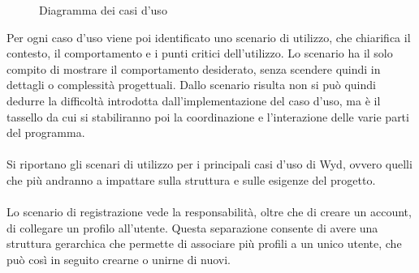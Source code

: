 \begin{figure}[htb]
    \centering
    \caption{Diagramma dei casi d'uso}
\end{figure}

Per ogni caso d'uso viene poi identificato uno scenario di utilizzo,
che chiarifica il contesto, il comportamento e i punti critici dell'utilizzo.
Lo scenario ha il solo compito di mostrare il comportamento desiderato,
senza scendere quindi in dettagli o complessità progettuali.
Dallo scenario risulta non si può quindi dedurre la difficoltà 
introdotta dall'implementazione del caso d'uso,
ma è il tassello da cui si stabiliranno poi la coordinazione e l'interazione delle varie parti del programma.\\
\\
Si riportano gli scenari di utilizzo per i principali casi d'uso di Wyd,
ovvero quelli che più andranno a impattare sulla struttura e sulle esigenze del progetto.\\
\\
Lo scenario di registrazione vede la responsabilità, oltre che di creare un account,
di collegare un profilo all'utente.
Questa separazione consente di avere una struttura gerarchica
che permette di associare più profili a un unico utente,
che può così in seguito crearne o unirne di nuovi.\\

